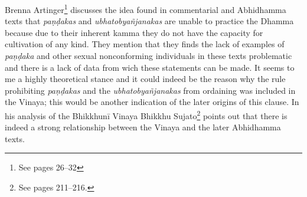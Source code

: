 Brenna Artinger\footnote{See \cite{artinger} pages 26–32} discusses the idea found in commentarial and Abhidhamma texts that {\em paṇḍakas} and {\em ubhatob­yañ­janakas} are unable to practice the Dhamma because due to their inherent kamma they do not have the capacity for cultivation of any kind. They mention that they finds the lack of examples of {\em paṇḍaka} and other sexual nonconforming individuals in these texts problematic and there is a lack of data from wich these statements can be made. It seems to me a highly theoretical stance and it could indeed be the reason why the rule prohibiting {\em paṇḍakas} and the {\em ubhatob­yañ­janakas} from ordaining was included in the Vinaya; this would be another indication of the later origins of this clause. In his analysis of the Bhikkhunī Vinaya Bhikkhu Sujato\footnote{See \cite{sujato2009} pages 211–216.} points out that there is indeed a strong relationship between the Vinaya and the later Abhidhamma texts.

